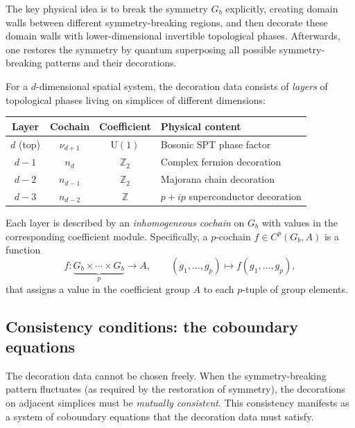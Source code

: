 \documentclass{SciPost}
\theoremstyle{definition}
\newcommand{\Z}{\mathbb{Z}}
\newcommand{\Zt}{\mathbb{Z}_2}
\newcommand{\U}{\mathrm{U}}
\newcommand{\Gb}{G_b}
\begin{document}
The key physical idea is to break the symmetry $\Gb$ explicitly, creating domain walls between different symmetry-breaking regions, and then decorate these domain walls with lower-dimensional invertible topological phases.
Afterwards, one restores the symmetry by quantum superposing all possible symmetry-breaking patterns and their decorations.

For a $d$-dimensional spatial system, the decoration data consists of \emph{layers} of topological phases living on simplices of different dimensions:

\begin{center}
\renewcommand{\arraystretch}{1.3}
\begin{tabular}{cccl}
\toprule
\textbf{Layer} & \textbf{Cochain} & \textbf{Coefficient} & \textbf{Physical content} \\
\midrule
$d$ (top) & $\nu_{d+1}$ & $\U(1)$ & Bosonic SPT phase factor \\
$d-1$ & $n_d$ & $\Zt$ & Complex fermion decoration \\
$d-2$ & $n_{d-1}$ & $\Zt$ & Majorana chain decoration \\
$d-3$ & $n_{d-2}$ & $\Z$ & $p+ip$ superconductor decoration \\
\bottomrule
\end{tabular}
\end{center}

Each layer is described by an \emph{inhomogeneous cochain} on $\Gb$ with values in the corresponding coefficient module.
Specifically, a $p$-cochain $f \in C^p(\Gb, A)$ is a function
\begin{equation}
f: \underbrace{\Gb \times \cdots \times \Gb}_{p} \longrightarrow A, \qquad (g_1, \ldots, g_p) \mapsto f(g_1, \ldots, g_p),
\end{equation}
that assigns a value in the coefficient group $A$ to each $p$-tuple of group elements.

\subsection{Consistency conditions: the coboundary equations}
\label{subsec:coboundary-eqs}

The decoration data cannot be chosen freely.
When the symmetry-breaking pattern fluctuates (as required by the restoration of symmetry), the decorations on adjacent simplices must be \emph{mutually consistent}.
This consistency manifests as a system of coboundary equations that the decoration data must satisfy.
\end{document}
